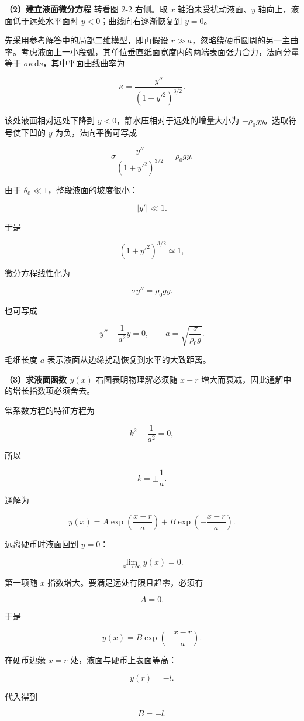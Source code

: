 \documentclass[12pt,a4paper,UTF8]{ctexart}
\begin{document}
\textbf{（2）建立液面微分方程} 转看图 2-2 右侧。取 \(x\)
轴沿未受扰动液面、\(y\) 轴向上，液面低于远处水平面时
\(y<0\)；曲线向右逐渐恢复到 \(y=0\)。

先采用参考解答中的局部二维模型，即再假设
\(r\gg a\)，忽略绕硬币圆周的另一主曲率。考虑液面上一小段弧，其单位垂直纸面宽度内的两端表面张力合力，法向分量等于
\(\sigma\kappa\,\mathrm{d}s\)，其中平面曲线曲率为

\[
\kappa=\frac{y''}{(1+y'^2)^{3/2}}.
\]

该处液面相对远处下降到 \(y<0\)，静水压相对于远处的增量大小为
\(-\rho_0gy\)。选取符号使下凹的 \(y\) 为负，法向平衡可写成

\[
\sigma\frac{y''}{(1+y'^2)^{3/2}}=\rho_0gy.
\]

由于 \(\theta_0\ll1\)，整段液面的坡度很小：

\[|y'|\ll1.\]

于是

\[
(1+y'^2)^{3/2}\simeq1,
\]

微分方程线性化为

\[
\boxed{\sigma y''=\rho_0gy}.
\]

也可写成

\[
\boxed{y''-\frac{1}{a^2}y=0},
\qquad
a=\sqrt{\frac{\sigma}{\rho_0g}}.
\]

毛细长度 \(a\) 表示液面从边缘扰动恢复到水平的大致距离。

\textbf{（3）求液面函数 \(y(x)\)} 右图表明物理解必须随 \(x-r\)
增大而衰减，因此通解中的增长指数项必须舍去。

常系数方程的特征方程为

\[k^2-\frac1{a^2}=0,\]

所以

\[k=\pm\frac1a.\]

通解为

\[
y(x)=A\exp\left(\frac{x-r}{a}\right)
+B\exp\left(-\frac{x-r}{a}\right).
\]

远离硬币时液面回到 \(y=0\)：

\[\lim_{x\to\infty}y(x)=0.\]

第一项随 \(x\) 指数增大。要满足远处有限且趋零，必须有

\[A=0.\]

于是

\[y(x)=B\exp\left(-\frac{x-r}{a}\right).\]

在硬币边缘 \(x=r\) 处，液面与硬币上表面等高：

\[y(r)=-l.\]

代入得到

\[B=-l.\]
\end{document}
